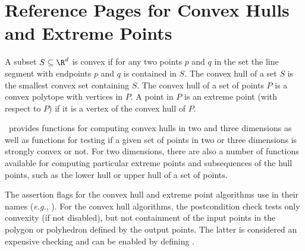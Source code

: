 
\clearpage
\section{Reference Pages for Convex Hulls and Extreme Points}

A subset $S \subseteq \R^d$ is convex if for any two points $p$ and $q$
in the set the line segment with endpoints $p$ and $q$ is contained
in $S$. The convex hull of a set $S$ is 
the smallest convex set containing
$S$. The convex hull of a set of points $P$ is a convex 
polytope with vertices in $P$.  A point in $P$ is an extreme point 
(with respect to $P$) if it is a vertex 
of the convex hull of $P$.

\cgal\ provides functions for computing convex hulls in two and three 
dimensions as well as functions for testing if a given set of points
in two or three dimensions is strongly convex or not.  For two dimensions,
there are also a number of functions available for computing particular
extreme points and subsequences of the hull points, such as the lower
hull or upper hull of a set of points.


The assertion flags for the convex hull and extreme point algorithms
use  in their names (\textit{e.g.}, ).
For the convex hull algorithms, the postcondition
check tests only convexity (if not disabled), but not containment of the
input points in the polygon or polyhedron defined by the output points.
The latter is considered an expensive checking and can be enabled by
defining %
.



\\
\\
\\
\\
\\
 \\

